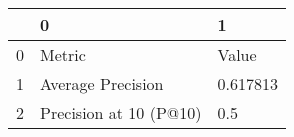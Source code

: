 \begin{tabular}{lll}
\toprule
{} &                       0 &         1 \\
\midrule
0 &                  Metric &     Value \\
1 &       Average Precision &  0.617813 \\
2 &  Precision at 10 (P@10) &       0.5 \\
\bottomrule
\end{tabular}
